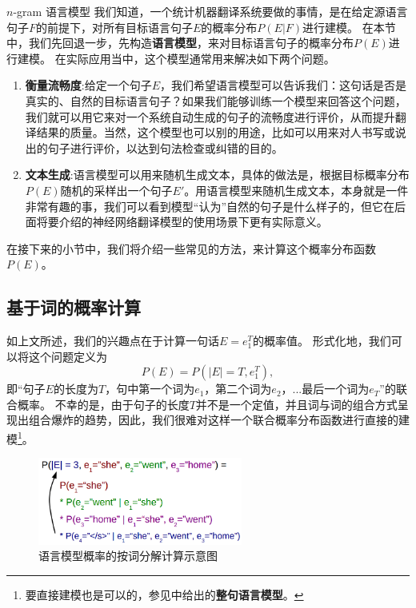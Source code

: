 \documentclass[10pt,a4paper]{ctexart}
\makeatletter
\renewcommand{\section}{\@startsection{section}{1}{0mm}
  {-\baselineskip}{0.5\baselineskip}{\bf\leftline}}
\makeatother
\begin{document}
\section{$n$-gram 语言模型}
我们知道，一个统计机器翻译系统要做的事情，是在给定源语言句子$F$的前提下，对所有目标语言句子$E$的概率分布$P(E | F)$进行建模。
在本节中，我们先回退一步，先构造\textbf{语言模型}，来对目标语言句子的概率分布$P(E)$进行建模。
在实际应用当中，这个模型通常用来解决如下两个问题。
\begin{enumerate}
\item[] \textbf{衡量流畅度}:给定一个句子$E$，我们希望语言模型可以告诉我们：这句话是否是真实的、自然的目标语言句子？如果我们能够训练一个模型来回答这个问题，我们就可以用它来对一个系统自动生成的句子的流畅度进行评价，从而提升翻译结果的质量。当然，这个模型也可以别的用途，比如可以用来对人书写或说出的句子进行评价，以达到句法检查或纠错的目的。
\item[] \textbf{文本生成}:语言模型可以用来随机生成文本，具体的做法是，根据目标概率分布$P(E)$随机的采样出一个句子$E'$。用语言模型来随机生成文本，本身就是一件非常有趣的事，我们可以看到模型“认为”自然的句子是什么样子的，但它在后面将要介绍的神经网络翻译模型的使用场景下更有实际意义。
\end{enumerate}
在接下来的小节中，我们将介绍一些常见的方法，来计算这个概率分布函数$P(E)$。

\subsection{基于词的概率计算}
如上文所述，我们的兴趣点在于计算一句话$E=e_1^T$的概率值。
形式化地，我们可以将这个问题定义为
\begin{equation}\label{eq:3}
  P(E) = P(|E| = T,e_1^T),
\end{equation}
即“句子$E$的长度为$T$，句中第一个词为$e_1$，第二个词为$e_2$，...最后一个词为$e_T$”的联合概率。
不幸的是，由于句子的长度$T$并不是一个定值，并且词与词的组合方式呈现出组合爆炸的趋势，因此，我们很难对这样一个联合概率分布函数进行直接的建模\footnote{要直接建模也是可以的，参见\cite{rosenfeld2001whole}中给出的\textbf{整句语言模型}。}。

\begin{figure}[H]
\centering
\includegraphics[width=0.6\textwidth]{fig2.png}
\caption{语言模型概率的按词分解计算示意图}
\label{fig:2}
\end{figure}
\end{document}
